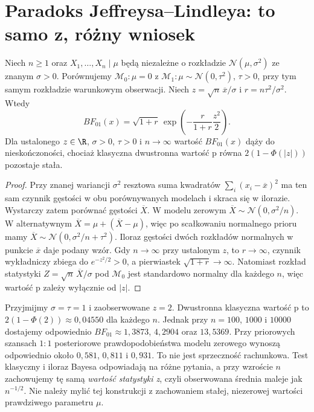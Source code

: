 \section{Paradoks Jeffreysa--Lindleya: to samo z, różny wniosek}
\begin{twierdzenie}
\label{thm:jeffreys-lindley}
Niech $n\ge1$ oraz $X_1,\ldots,X_n\mid\mu$ będą
niezależne o rozkładzie $\mathcal N(\mu,\sigma^2)$
ze znanym $\sigma>0$. Porównujemy
$\mathcal M_0:\mu=0$ z
$\mathcal M_1:\mu\sim\mathcal N(0,\tau^2)$,
$\tau>0$, przy tym samym rozkładzie warunkowym
obserwacji. Niech $z=\sqrt n\,\overline x/\sigma$
i $r=n\tau^2/\sigma^2$. Wtedy
\[
 BF_{01}(x)=\sqrt{1+r}\,
 \exp\!\left(-\frac{r}{1+r}\frac{z^2}{2}\right).
\]
Dla ustalonego $z\in\R$, $\sigma>0$, $\tau>0$ i $n\to\infty$
wartość $BF_{01}(x)$ dąży do nieskończoności, chociaż
klasyczna dwustronna wartość p równa
$2(1-\Phi(|z|))$ pozostaje stała.
\end{twierdzenie}
\begin{proof}
Przy znanej wariancji $\sigma^2$ resztowa suma kwadratów
$\sum_i(x_i-\overline x)^2$ ma ten sam czynnik gęstości
w obu porównywanych modelach i skraca się w ilorazie.
Wystarczy zatem porównać gęstości $\overline X$.
W modelu zerowym $\overline X\sim\mathcal N(0,\sigma^2/n)$.
W alternatywnym $\overline X=\mu+(\overline X-\mu)$,
więc po scałkowaniu normalnego prioru mamy
$\overline X\sim\mathcal N(0,\sigma^2/n+\tau^2)$.
Iloraz gęstości dwóch rozkładów normalnych w punkcie
$\overline x$ daje podany wzór.
Gdy $n\to\infty$ przy ustalonym $z$, to $r\to\infty$,
czynnik wykładniczy zbiega do $e^{-z^2/2}>0$,
a pierwiastek $\sqrt{1+r}\to\infty$. Natomiast rozkład
statystyki $Z=\sqrt n\,\overline X/\sigma$ pod $\mathcal M_0$
jest standardowo normalny dla każdego $n$, więc
wartość p zależy wyłącznie od $|z|$.
\end{proof}

\begin{przyklad}
Przyjmijmy $\sigma=\tau=1$ i zaobserwowane $z=2$.
Dwustronna klasyczna wartość p to
$2(1-\Phi(2))\approx0{,}04550$ dla każdego $n$.
Jednak przy $n=100$, $1000$ i $10000$ dostajemy
odpowiednio $BF_{01}\approx1{,}3873$, $4{,}2904$ oraz
$13{,}5369$. Przy priorowych szansach $1:1$
posteriorowe prawdopodobieństwa modelu zerowego wynoszą
odpowiednio około $0{,}581$, $0{,}811$ i $0{,}931$.
To nie jest sprzeczność rachunkowa. Test klasyczny i iloraz
Bayesa odpowiadają na różne pytania, a przy wzroście $n$
zachowujemy tę samą \emph{wartość statystyki z}, czyli
obserwowana średnia maleje jak $n^{-1/2}$.
Nie należy mylić tej konstrukcji z zachowaniem
stałej, niezerowej wartości prawdziwego parametru $\mu$.
\end{przyklad}

